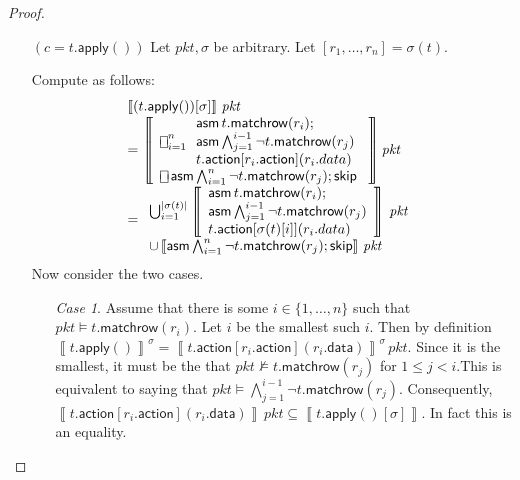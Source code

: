 \documentclass{article}
\newcommand{\pkt}{\mathit{pkt}}
\newcommand{\denote}[1]{\left\llbracket#1\right\rrbracket}
\newcommand{\action}{\mathsf{action}}
\newcommand{\data}{\mathsf{data}}
\newcommand{\assume}{\mathop{\mathsf{asm}}}
\newcommand{\apply}{\mathsf{apply}}
\newcommand{\choiceop}{\rotatebox[origin=c]{90}{$\sqsubset\!\!\!\sqsupset$}}
\newcommand{\choice}{\mathbin{\choiceop}}
\DeclareMathOperator*{\bigchoice}{\scalerel*{\choiceop}{\sum}}
\newcommand{\SKIP}{\mathsf{skip}}
\newcommand{\matchrow}{\mathsf{matchrow}}
\begin{document}
\begin{proof}
\begin{enumerate}[align=left]
    \item[$(c = t.\apply())$] Let $\pkt,\sigma$ be arbitrary. Let $[r_1, \ldots,
      r_n] = \sigma(t)$.

      Compute as follows:
      \[
      \begin{array}{ll}
        \denote{(t.\apply())[\sigma]}\,\pkt\\
        = \denote{
          \begin{array}{l}
            \bigchoice_{i=1}^{n}
            \begin{array}{l}
              \assume t.\matchrow(r_i);\\
              \assume \bigwedge_{j=1}^{i-1}\neg t.\matchrow(r_j)\\
              t.\action[r_i.\action](r_i.data)
            \end{array} \\
            \choice \assume \bigwedge_{i=1}^{n} \neg  t.\matchrow(r_j); \SKIP
        \end{array}}\pkt \\
        = \begin{array}{l}
          \bigcup_{i=1}^{|\sigma(t)|}
          \denote{
            \begin{array}{l}
              \assume t.\matchrow(r_i);\\
              \assume \bigwedge_{j=1}^{i-1}\neg t.\matchrow(r_j)\\
              t.\action[\sigma(t)[i]](r_i.data)
            \end{array}}\,\pkt\\
            \cup \denote{\assume \bigwedge_{i=1}^{n} \neg  t.\matchrow(r_j); \SKIP}\,\pkt
        \end{array} \\
        \end{array}
      \]
      Now consider the two cases.

      \begin{enumerate}
      \item[\textit{Case 1}.] Assume that there is some $i \in \{1,\ldots,
        n\}$ such that $\pkt \models t.\matchrow(r_i)$. Let $i$ be the
        smallest such $i$. Then by definition $\denote{t.\apply()}^\sigma =
        \denote{t.\action[r_i.\action](r_i.\data)}^\sigma\,\pkt$. Since it is
        the smallest, it must be the that $\pkt \not\models t.\matchrow(r_j)$
        for $1 \leq j < i$.This is equivalent to saying that $\pkt
        \models\bigwedge_{j=1}^{i-1}\neg t.\matchrow(r_j)$. Consequently,
        $\denote{t.\action[r_i.\action](r_i.\data)}\,\pkt \subseteq
        \denote{t.\apply()[\sigma]}$. In fact this is an equality.


\end{enumerate}
\end{enumerate}
\end{proof}
\end{document}
